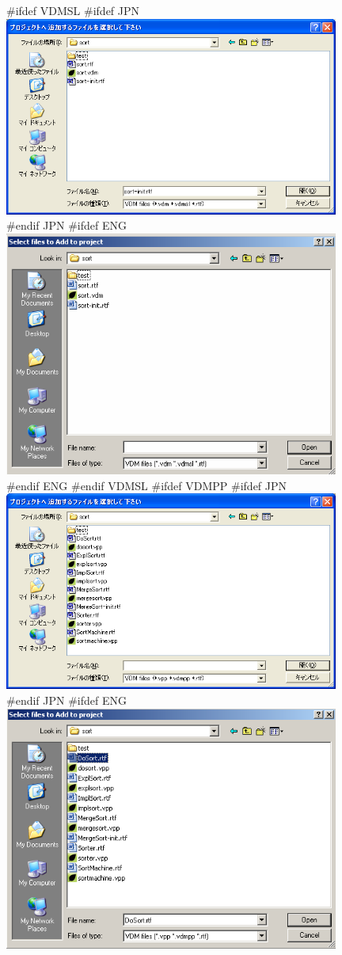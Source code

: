 \documentclass[\pformat,12pt]{article}
\begin{document}
\begin{figure}[tbh]
\begin{center}
#ifdef VDMSL
#ifdef JPN
\includegraphics[width=11cm]{addFiles-sl.png}
#endif JPN
#ifdef ENG
\includegraphics[width=11cm]{addFiles-slENG.png}
#endif ENG
#endif VDMSL
#ifdef VDMPP
#ifdef JPN
\includegraphics[width=11cm]{addFiles-pp.png}
#endif JPN
#ifdef ENG
\includegraphics[width=11cm]{addFiles-ppENG.png}

\end{center}
\end{figure}
\end{document}
